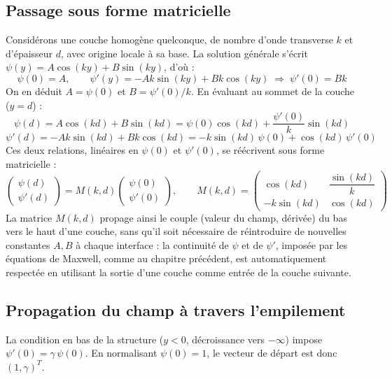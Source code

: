 \documentclass[a4paper,11pt]{report}
\begin{document}
\subsection*{Passage sous forme matricielle}

Considérons une couche homogène quelconque, de nombre d'onde transverse $k$ et d'épaisseur $d$, avec origine locale à sa base. La solution générale s'écrit $\psi(y)=A\cos(ky)+B\sin(ky)$, d'où :
\begin{equation}
\psi(0)=A, \qquad \psi'(y)=-Ak\sin(ky)+Bk\cos(ky) \;\Rightarrow\; \psi'(0)=Bk
\end{equation}
On en déduit $A=\psi(0)$ et $B=\psi'(0)/k$. En évaluant au sommet de la couche ($y=d$) :
\begin{equation}
\psi(d)=A\cos(kd)+B\sin(kd) = \psi(0)\cos(kd)+\frac{\psi'(0)}{k}\sin(kd)
\end{equation}
\begin{equation}
\psi'(d)=-Ak\sin(kd)+Bk\cos(kd) = -k\sin(kd)\,\psi(0)+\cos(kd)\,\psi'(0)
\end{equation}
Ces deux relations, linéaires en $\psi(0)$ et $\psi'(0)$, se réécrivent sous forme matricielle :
\begin{equation}
\begin{pmatrix}\psi(d)\\\psi'(d)\end{pmatrix} = M(k,d)\begin{pmatrix}\psi(0)\\\psi'(0)\end{pmatrix}, \qquad
M(k,d)=\begin{pmatrix}\cos(kd) & \dfrac{\sin(kd)}{k} \\[4pt] -k\sin(kd) & \cos(kd)\end{pmatrix}
\label{eq:matrice_transfert}
\end{equation}
La matrice $M(k,d)$ propage ainsi le couple (valeur du champ, dérivée) du bas vers le haut d'une couche, sans qu'il soit nécessaire de réintroduire de nouvelles constantes $A,B$ à chaque interface : la continuité de $\psi$ et de $\psi'$, imposée par les équations de Maxwell, comme au chapitre précédent, est automatiquement respectée en utilisant la sortie d'une couche comme entrée de la couche suivante.

\subsection*{Propagation du champ à travers l'empilement}

La condition en bas de la structure ($y<0$, décroissance vers $-\infty$) impose $\psi'(0)=\gamma\,\psi(0)$. En normalisant $\psi(0)=1$, le vecteur de départ est donc $(1,\gamma)^T$.
\end{document}
